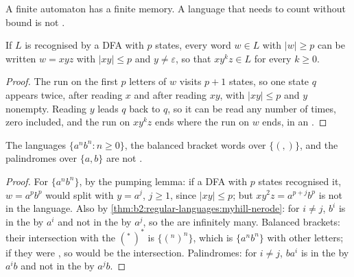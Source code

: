 A finite automaton has a finite memory. A language that needs to count without bound is not .

\begin{theorem}\label{thm:b2:regular-languages:pumping}
If $L$ is recognised by a DFA with $p$ states, every word $w \in L$ with $|w| \ge p$ can be written $w = xyz$ with
$|xy| \le p$ and $y \ne \varepsilon$, so that $xy^kz \in L$ for every $k \ge 0$.
\end{theorem}

\begin{proof}
The run on the first $p$ letters of $w$ visits $p + 1$ states, so one state $q$ appears twice, after reading $x$ and
after reading $xy$, with $|xy| \le p$ and $y$ nonempty. Reading $y$ leads $q$ back to $q$, so it can be read any
number of times, zero included, and the run on $xy^kz$ ends where the run on $w$ ends, in an .
\end{proof}

\begin{proposition}\label{prop:b2:regular-languages:nonregular}
The languages $\{a^n b^n : n \ge 0\}$, the balanced bracket words over $\{(, )\}$, and the palindromes over $\{a, b\}$
are not .
\end{proposition}

\begin{proof}
For $\{a^nb^n\}$, by the pumping lemma: if a DFA with $p$ states recognised it, $w = a^pb^p$ would split with $y =
a^j$, $j \ge 1$, since $|xy| \le p$; but $xy^2z = a^{p+j}b^p$ is not in the language. Also by
\cref{thm:b2:regular-languages:myhill-nerode}: for $i \ne j$, $b^i$ is in the  by $a^i$ and not in the 
by $a^j$, so the  are infinitely many. Balanced brackets: their intersection with the 
$(^*\,)^*$ is $\{(^n )^n\}$, which is $\{a^nb^n\}$ with other letters; if they were , so would be the
intersection. Palindromes: for $i \ne j$, $ba^i$ is in the  by $a^ib$ and not in the  by $a^jb$.
\end{proof}


